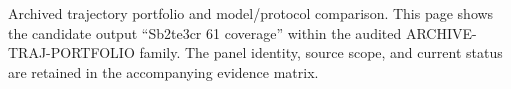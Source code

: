 Archived trajectory portfolio and model/protocol comparison. This page shows the candidate output ``Sb2te3cr 61 coverage'' within the audited ARCHIVE-TRAJ-PORTFOLIO family. The panel identity, source scope, and current status are retained in the accompanying evidence matrix.
